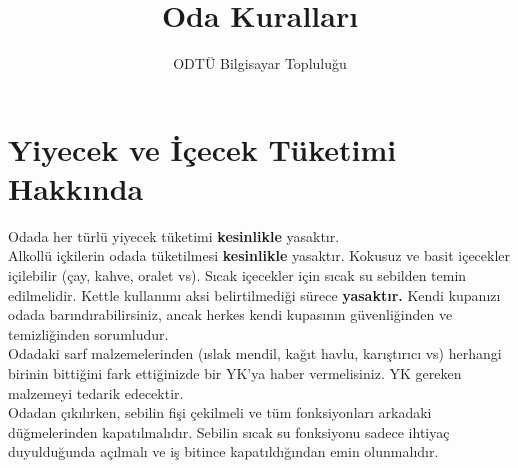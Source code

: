 \documentclass{article}
\title{Oda Kuralları}
\author{ODTÜ Bilgisayar Topluluğu}
\begin{document}
\maketitle



\section{Yiyecek ve İçecek Tüketimi Hakkında} 

\hspace{5mm} Odada her türlü yiyecek tüketimi \textbf{kesinlikle} yasaktır. \\

Alkollü içkilerin odada tüketilmesi \textbf{kesinlikle} yasaktır. Kokusuz ve basit içecekler içilebilir (çay, kahve, oralet vs). Sıcak içecekler için sıcak su sebilden temin edilmelidir. Kettle kullanımı aksi belirtilmediği sürece \textbf{yasaktır.} Kendi kupanızı odada barındırabilirsiniz, ancak herkes kendi kupasının güvenliğinden ve temizliğinden sorumludur. \\

Odadaki sarf malzemelerinden (ıslak mendil, kağıt havlu, karıştırıcı vs) herhangi birinin bittiğini fark ettiğinizde bir YK'ya haber vermelisiniz. YK gereken malzemeyi tedarik edecektir. \\

Odadan çıkılırken, sebilin fişi çekilmeli ve tüm fonksiyonları arkadaki düğmelerinden kapatılmalıdır. Sebilin sıcak su fonksiyonu sadece ihtiyaç duyulduğunda açılmalı ve iş bitince kapatıldığından emin olunmalıdır. \\
\end{document}
